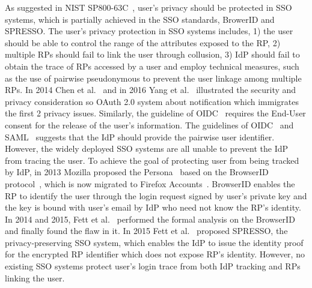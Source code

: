 

As suggested in NIST SP800-63C~\cite{NIST2017draft}, user's privacy should be protected in SSO systems, which is partially achieved in the SSO standards, BrowerID and SPRESSO.
The user's privacy protection in SSO systems includes, 1) the user should be able to control the range of the attributes exposed to the RP, 2) multiple RPs should fail to link the user through collusion, 3) IdP should fail to obtain the trace of RPs accessed by a user and employ technical measures, such as the use of pairwise pseudonymous to prevent the user linkage among multiple RPs.
In 2014 Chen et al.~\cite{ChenPCTKT14} and in 2016 Yang et al.~\cite{YangLLZH16} illustrated the security and privacy consideration so OAuth 2.0 system about notification which immigrates the first 2 privacy issues. Similarly, the guideline of OIDC~\cite{OpenIDConnect} requires the End-User consent for the release of the user's information.
The guidelines of OIDC~\cite{OpenIDConnect} and SAML~\cite{SAML} suggests that the IdP should provide the pairwise user identifier.
However, the widely deployed SSO systems are all unable to prevent the IdP from tracing the user. To achieve the goal of protecting user from being tracked by IdP, in 2013 Mozilla proposed the Persona~\cite{persona} based on the BrowserID protocol~\cite{BrowserID}, which is now migrated to Firefox Accounts~\cite{FirefoxAccount}. BrowserID enables the RP to identify the user through the login request signed by user's private key and the key is bound with user's email by IdP who need not know the  RP's identity. In 2014 and 2015, Fett et al.~\cite{FettKS14, BrowserID} performed the formal analysis on the BrowserID and finally found the flaw in it. In 2015 Fett et al.~\cite{SPRESSO} proposed SPRESSO, the privacy-preserving SSO system, which enables the IdP to issue the identity proof for the encrypted RP identifier which does not expose RP's identity. However, no existing SSO systems protect user's login trace from both IdP tracking and RPs linking the user.

